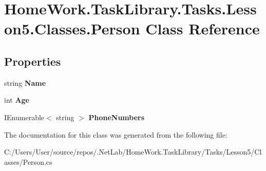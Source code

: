 \hypertarget{class_home_work_1_1_task_library_1_1_tasks_1_1_lesson5_1_1_classes_1_1_person}{}\section{Home\+Work.\+Task\+Library.\+Tasks.\+Lesson5.\+Classes.\+Person Class Reference}
\label{class_home_work_1_1_task_library_1_1_tasks_1_1_lesson5_1_1_classes_1_1_person}
\subsection*{Properties}
\begin{DoxyCompactItemize}
\item 
\mbox{\label{class_home_work_1_1_task_library_1_1_tasks_1_1_lesson5_1_1_classes_1_1_person_a19bb385a0d60190d93d0db4d23f2ce49}} 
string {\bfseries Name}
\item 
\mbox{\label{class_home_work_1_1_task_library_1_1_tasks_1_1_lesson5_1_1_classes_1_1_person_a53ac2898e42d3102441c318d78499fec}} 
int {\bfseries Age}
\item 
\mbox{\label{class_home_work_1_1_task_library_1_1_tasks_1_1_lesson5_1_1_classes_1_1_person_a69642f54e42b6bb722bec18955714b5b}} 
I\+Enumerable$<$ string $>$ {\bfseries Phone\+Numbers}
\end{DoxyCompactItemize}


The documentation for this class was generated from the following file\+:\begin{DoxyCompactItemize}
\item 
C\+:/\+Users/\+User/source/repos/.\+Net\+Lab/\+Home\+Work.\+Task\+Library/\+Tasks/\+Lesson5/\+Classes/Person.\+cs\end{DoxyCompactItemize}
